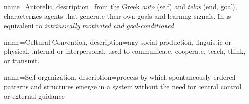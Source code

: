 \makeglossaries

{
    name=Autotelic,
    description={from the Greek \textit{auto} (self) and \textit{telos} (end, goal), characterizes agents that generate their own goals and learning signals. In is equivalent to \textit{intrinsically motivated and goal-conditioned}}
}

{
	name=Cultural Convention,
	description={any social production, linguistic or physical, internal or interpersonal, used to communicate, cooperate, teach, think, or transmit.}
}

{
	name=Self-organization,
	description={process by which spontaneously ordered patterns and structures emerge in a system without the need for central control or external guidance}
}